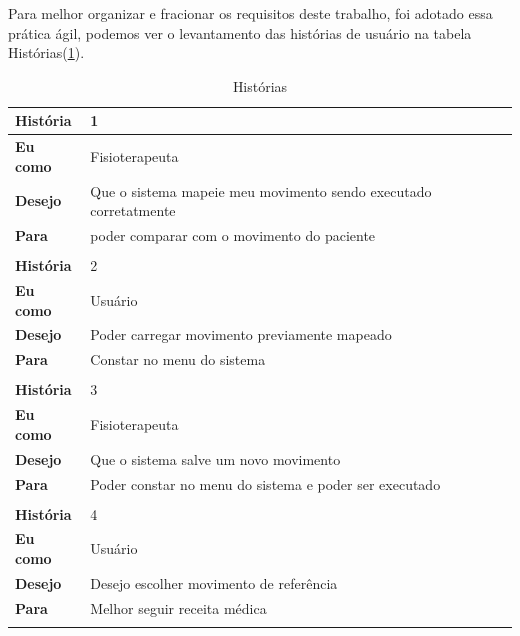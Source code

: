    Para melhor organizar e fracionar os requisitos deste trabalho, foi adotado
 essa prática ágil, podemos ver o levantamento das histórias de usuário na tabela Histórias(\ref{historias}).
 \begin{table}[H]
 \centering
 \caption{Histórias}
 \label{historias}
 \begin{tabular}{|l|l|}
 \hline
 \textbf{História} & 1                                                        \\ \hline
 \textbf{Eu como}  & Fisioterapeuta                    \\ \hline
 \textbf{Desejo}   & Que o sistema mapeie meu movimento sendo executado corretatmente                   \\ \hline
 \textbf{Para}     & poder comparar com o movimento do paciente \\ \hline
  \multicolumn{2}{|l|}{}                                                       \\ \hline
 \textbf{História} & 2                                                        \\ \hline
 \textbf{Eu como}  & Usuário                                    \\ \hline
 \textbf{Desejo}   & Poder carregar movimento previamente mapeado                \\ \hline
 \textbf{Para}     & Constar no menu do sistema\\ \hline
 \multicolumn{2}{|l|}{}                                                       \\ \hline
 \textbf{História} & 3                                                        \\ \hline
 \textbf{Eu como}  & Fisioterapeuta                    \\ \hline
 \textbf{Desejo}   & Que o sistema salve um novo movimento                    \\ \hline
 \textbf{Para}     & Poder constar no menu do sistema e poder ser executado \\ \hline
 \multicolumn{2}{|l|}{}                                                       \\ \hline
 \textbf{História} & 4                                                        \\ \hline
 \textbf{Eu como}  & Usuário                                                  \\ \hline
 \textbf{Desejo}   & Desejo escolher movimento de referência                  \\ \hline
 \textbf{Para}     & Melhor seguir receita médica                             \\ \hline
 \multicolumn{2}{|l|}{}                                                       \\ \hline


\end{tabular}
\end{table}
